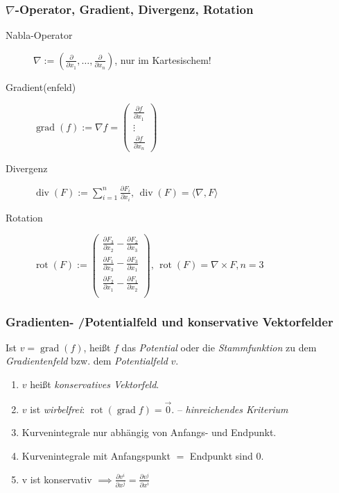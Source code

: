 \documentclass[a4paper, 9pt, DIV=24]{scrartcl}
\DeclareMathOperator{\grad}{grad}
\DeclareMathOperator{\rot}{rot}
\DeclareMathOperator{\Div}{div}
\begin{document}
\subsubsection{$\nabla$-Operator, Gradient, Divergenz, Rotation}
\begin{description}
 \item[Nabla-Operator] $\nabla := (\frac{\partial}{\partial x_1},\dots,\frac{\partial}{\partial x_n})$, nur im Kartesischem!
 \item[Gradient(enfeld)] $\grad(f) := \nabla f = \begin{pmatrix}\frac{\partial f}{\partial x_1} \\\vdots\\ \frac{\partial f}{\partial x_n}\end{pmatrix}$
 \item[Divergenz] $\Div(F) := \sum_{i=1}^n\frac{\partial F_i}{\partial x_i},\, \Div(F) = \langle \nabla, F \rangle$
 \item[Rotation] $\rot(F) := \begin{pmatrix}
\frac{\partial F_3}{\partial x_2} - \frac{\partial F_2}{\partial x_3} \\
\frac{\partial F_1}{\partial x_3} - \frac{\partial F_3}{\partial x_1} \\
\frac{\partial F_2}{\partial x_1} - \frac{\partial F_1}{\partial x_2} \\
\end{pmatrix},\, \rot(F) = \nabla \times F, n = 3$
\end{description}

\subsubsection{Gradienten- /Potentialfeld und konservative Vektorfelder}
Ist $v = \grad(f)$, heißt $f$ das \emph{Potential} oder die \emph{Stammfunktion} zu dem \emph{Gradientenfeld} bzw. dem \emph{Potentialfeld} $v$.
\begin{enumerate}[label={(}\arabic*{)}]
 \item $v$ heißt \emph{konservatives Vektorfeld}.
 \item $v$ ist \emph{wirbelfrei}: $\rot(\grad f) = \vec{0}$. -- \emph{hinreichendes Kriterium}
 \item Kurvenintegrale nur abhängig von Anfangs- und Endpunkt.
 \item Kurvenintegrale mit Anfangspunkt $=$ Endpunkt sind $0$.
 \item v ist konservativ $\implies \frac{\partial v^i}{\partial x^j}=\frac{\partial v^j}{\partial x^i}$
\end{enumerate}
\end{document}
